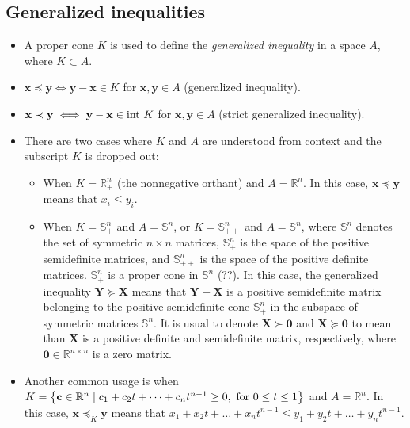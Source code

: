 \documentclass{article}
\begin{document}
\subsection{Generalized inequalities}
\begin{itemize}
	\item A proper cone \(K\) is used to define the \textit{generalized inequality} in a space \(A\), where \(K \subset A\).
	\item \(\mathbf{x} \preceq \mathbf{y} \iff \mathbf{y} - \mathbf{x} \in K\) for \(\mathbf{x}, \mathbf{y} \in A\) (generalized inequality).
	\item \(\mathbf{x} \prec \mathbf{y} \iff \mathbf{y} - \mathbf{x} \in \textnormal{int }K\) for \(\mathbf{x}, \mathbf{y} \in A\) (strict generalized inequality).
	\item There are two cases where \(K\) and \(A\) are understood from context and the subscript \(K\) is dropped out:
	      \begin{itemize}[label={$\triangleright$}]
		      \item When \(K = \mathbb{R}^{n}_{+}\) (the nonnegative orthant) and \(A = \mathbb{R}^{n}\). In this case, \(\mathbf{x} \preceq \mathbf{y}\) means that \(x_i \leq y_i\).
		      \item When \(K = \mathbb{S}^{n}_{+}\) and \(A = \mathbb{S}^{n}\), or \(K = \mathbb{S}^{n}_{++}\) and \(A = \mathbb{S}^{n}\), where \(\mathbb{S}^{n}\) denotes the set of symmetric \(n\times n\) matrices, \(\mathbb{S}^{n}_{+}\) is the space of the positive semidefinite matrices, and \(\mathbb{S}^{n}_{++}\) is the space of the positive definite matrices. \(\mathbb{S}^{n}_{+}\) is a proper cone in \(\mathbb{S}^{n}\) (??). In this case, the generalized inequality \(\mathbf{Y} \succeq \mathbf{X}\) means that \(\mathbf{Y}-\mathbf{X}\) is a positive semidefinite matrix belonging to the positive semidefinite cone \(\mathbb{S}^{n}_{+}\) in the subspace of symmetric matrices \(\mathbb{S}^{n}\). It is usual to denote \(\mathbf{X} \succ \mathbf{0}\) and \(\mathbf{X} \succeq \mathbf{0}\) to mean than \(\mathbf{X}\) is a positive definite and semidefinite matrix, respectively, where \(\mathbf{0} \in \mathbb{R}^{n\times n}\) is a zero matrix.
	      \end{itemize}
	\item Another common usage is when \(K = \left\{ \mathbf{c} \in \mathbb{R}^{n} \mid c_1 + c_2 t + \dots + c_n t^{n-1} \geq 0, \textnormal{ for } 0\leq t\leq 1 \right\}\) and \(A = \mathbb{R}^{n}\). In this case, \(\mathbf{x} \preceq_K \mathbf{y}\) means that \(x_1 + x_2 t + \dots + x_n t^{n-1} \leq y_1 + y_2 t + \dots + y_n t^{n-1}\).

\end{itemize}
\end{document}
